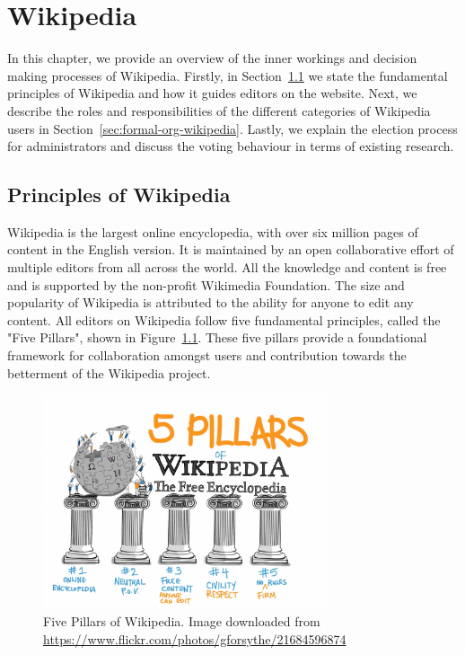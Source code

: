 \chapter{Wikipedia}
\label{chp:wikipedia}
In this chapter, we provide an overview of the inner workings and decision making processes of Wikipedia.
Firstly, in Section~\ref{sec:principles-wikipedia} we state the fundamental principles of Wikipedia and how it guides editors on the website.
Next, we describe the roles and responsibilities of the  different categories of Wikipedia users in Section~\ref{sec:formal-org-wikipedia}.
Lastly, we explain the election process for administrators and discuss the voting behaviour in terms of existing research. 

\section{Principles of Wikipedia}
\label{sec:principles-wikipedia}
Wikipedia is the largest online encyclopedia, with over six million pages of content in the English version.
It is maintained by an open collaborative effort of multiple editors from all across the world.
All the knowledge and content is free and is supported by the non-profit Wikimedia Foundation.
The size and popularity of Wikipedia is attributed to the ability for anyone to edit any content.
All editors on Wikipedia follow five fundamental principles, called the "Five Pillars", shown in Figure~\ref{fig:5-pillars}. 
These five pillars provide a foundational framework for collaboration amongst users and contribution towards the betterment of the Wikipedia project.  
\begin{figure}[!ht]
    \centering
    \includegraphics[width=0.75\textwidth]{images/Pillars.pdf}
    \caption{Five Pillars of Wikipedia. Image downloaded from \url{https://www.flickr.com/photos/gforsythe/21684596874}}
    \label{fig:5-pillars}   
\end{figure}

